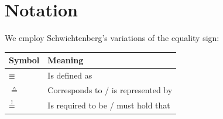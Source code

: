
%

\chapter{Notation}

We employ Schwichtenberg's\cite{schwichtenberg2018} variations of the equality sign:

\begin{table}[h]
    \centering
    \footnotesize
    \begin{tabular}{ll}
        \toprule
        Symbol & Meaning \\
        \midrule
        \(\mathrel{\equiv}\) & Is defined as \\
        \(\corresponds\) & Corresponds to / is represented by \\
        \(\mathrel{\stackrel{!}{=}}\) & Is required to be / must hold that \\
        \bottomrule
    \end{tabular}
\end{table}
